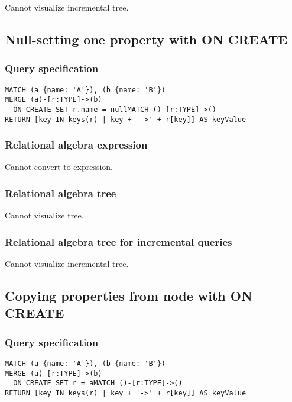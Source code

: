 Cannot visualize incremental tree.

\subsection{Null-setting one property with ON CREATE}

\subsubsection*{Query specification}

\begin{lstlisting}
MATCH (a {name: 'A'}), (b {name: 'B'})
MERGE (a)-[r:TYPE]->(b)
  ON CREATE SET r.name = nullMATCH ()-[r:TYPE]->()
RETURN [key IN keys(r) | key + '->' + r[key]] AS keyValue
\end{lstlisting}

\subsubsection*{Relational algebra expression}

Cannot convert to expression.

\subsubsection*{Relational algebra tree}

Cannot visualize tree.

\subsubsection*{Relational algebra tree for incremental queries}

Cannot visualize incremental tree.

\subsection{Copying properties from node with ON CREATE}

\subsubsection*{Query specification}

\begin{lstlisting}
MATCH (a {name: 'A'}), (b {name: 'B'})
MERGE (a)-[r:TYPE]->(b)
  ON CREATE SET r = aMATCH ()-[r:TYPE]->()
RETURN [key IN keys(r) | key + '->' + r[key]] AS keyValue
\end{lstlisting}

